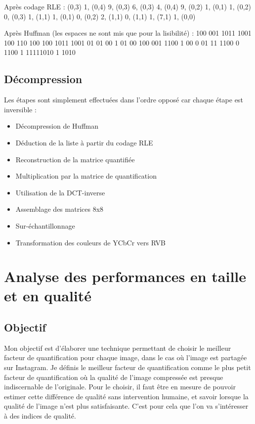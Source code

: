 \documentclass{article}
\begin{document}
Après codage RLE : (0,3) 1, (0,4) 9, (0,3) 6, (0,3) 4, (0,4) 9, (0,2) 1, (0,1) 1, (0,2) 0, (0,3) 1, (1,1) 1, (0,1) 0, (0,2) 2, (1,1) 0, (1,1) 1, (7,1) 1, (0,0) 

\vspace{.3cm} 

Après Huffman (les espaces ne sont mis que pour la lisibilité) : 100 001 1011 1001 100 110 100 100 1011 1001 01 01 00 1 01 00 100 001 1100 1 00 0 01 11 1100 0 1100 1 11111010 1 1010


\subsection{Décompression}

Les étapes sont simplement effectuées dans l'ordre opposé car chaque étape est inversible :
\begin{itemize}[noitemsep,nolistsep]
    \item Décompression de Huffman
    \item Déduction de la liste à partir du codage RLE
    \item Reconstruction de la matrice quantifiée
    \item Multiplication par la matrice de quantification
    \item Utilisation de la DCT-inverse
    \item Assemblage des matrices 8x8
    \item Sur-échantillonnage
    \item Transformation des couleurs de YCbCr vers RVB
\end{itemize}


\section{Analyse des performances en taille et en qualité}


\subsection{Objectif}
Mon objectif est d'élaborer une technique permettant de choisir le meilleur facteur de quantification pour chaque image, dans le cas où l'image est partagée sur Instagram. Je définis le meilleur facteur de quantification comme le plus petit facteur de quantification où la qualité de l'image compressée est presque indiscernable de l'originale. Pour le choisir, il faut être en mesure de pouvoir estimer cette différence de qualité sans intervention humaine, et savoir lorsque la qualité de l'image n'est plus satisfaisante. C'est pour cela que l'on va s'intéresser à des indices de qualité.
\end{document}
